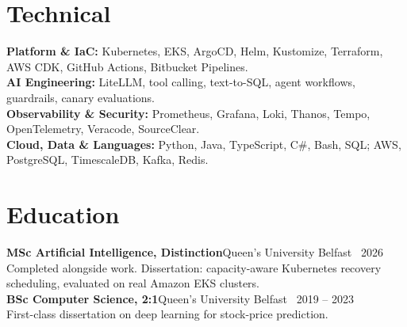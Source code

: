 \documentclass[a4paper,10pt]{article}
\newcommand{\lead}[1]{\textcolor{accent}{\textbf{#1}}}
\begin{document}
\section*{Technical}
\lead{Platform \& IaC:} Kubernetes, EKS, ArgoCD, Helm, Kustomize, Terraform, AWS CDK, GitHub Actions, Bitbucket Pipelines. \\[2pt]
\lead{AI Engineering:} LiteLLM, tool calling, text-to-SQL, agent workflows, guardrails, canary evaluations. \\[2pt]
\lead{Observability \& Security:} Prometheus, Grafana, Loki, Thanos, Tempo, OpenTelemetry, Veracode, SourceClear. \\[2pt]
\lead{Cloud, Data \& Languages:} Python, Java, TypeScript, C\#, Bash, SQL; AWS, PostgreSQL, TimescaleDB, Kafka, Redis.

\section*{Education}
\textbf{MSc Artificial Intelligence, Distinction}\hfill\textcolor{muted}{Queen's University Belfast \textperiodcentered\ 2026} \\[1pt]
Completed alongside work. Dissertation: capacity-aware Kubernetes recovery scheduling, evaluated on real Amazon EKS clusters. \\[4pt]
\textbf{BSc Computer Science, 2:1}\hfill\textcolor{muted}{Queen's University Belfast \textperiodcentered\ 2019 -- 2023} \\[1pt]
First-class dissertation on deep learning for stock-price prediction.
\end{document}
